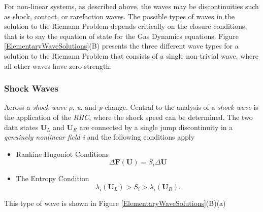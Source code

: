 \documentclass[]{article}
\begin{document}
			For non-linear systems, as described above, the waves may be discontinuities such as shock, contact, or rarefaction waves. The possible types of waves in the solution to the Riemann Problem depends critically on the closure conditions, that is to say the equation of state for the Gas Dynamics equations. Figure \ref{ElementaryWaveSolutions}(B) presents the three different wave types for a solution to the Riemann Problem that consists of a single non-trivial wave, where all other waves have zero strength.
		
		\subsubsection{Shock Waves}
			Across a \textit{shock wave} $ \rho $, \textit{u}, and \textit{p} change. Central to the analysis of a \textit{shock wave} is the application of the \textit{RHC}, where the shock speed can be determined. 
			The two data states $ \textbf{U}_L $ and $ \textbf{U}_R $ are connected by a single jump discontinuity in a \textit{genuinely nonlinear field i} and the following conditions apply
			\begin{itemize}
				\item Rankine Hugoniot Conditions
				\begin{equation}
					\Delta \textbf{F}(\textbf{U}) = S_i \Delta \textbf{U}
				\end{equation}
				\item The Entropy Condition
				\begin{equation}
				\lambda_i(\textbf{U}_L) > S_i > \lambda_i(\textbf{U}_R).
				\end{equation}
			\end{itemize}
			This type of wave is shown in Figure \ref{ElementaryWaveSolutions}(B)(a)		
		
\end{document}
